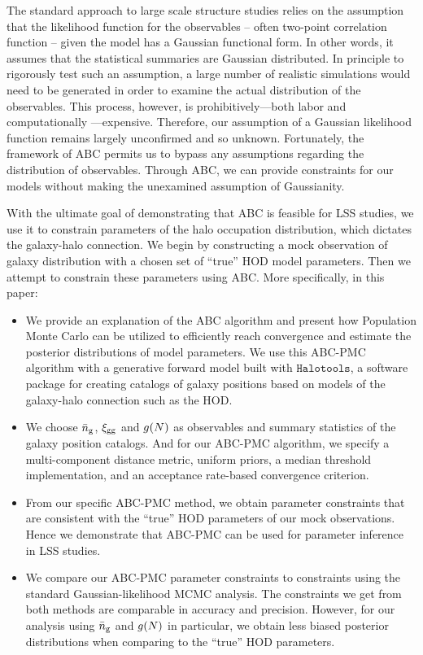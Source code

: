 The standard approach to large scale structure studies relies on the assumption that the likelihood function 
for the observables -- often two-point correlation function -- given the model has a Gaussian functional form. 
In other words, it assumes that the statistical summaries are Gaussian distributed. In principle to rigorously 
test such an assumption, a large number of realistic simulations would need to be generated in order to examine 
the actual distribution of the observables. This process, however, is prohibitively---both labor and computationally 
---expensive. Therefore, our assumption of a Gaussian likelihood function remains largely unconfirmed and so 
unknown. Fortunately, the framework of ABC permits us to bypass any 
assumptions regarding the distribution of observables. Through ABC, we can provide constraints for our models without making the unexamined assumption of Gaussianity. 

With the ultimate goal of demonstrating that ABC is feasible for LSS studies, we use it to 
constrain parameters of the halo occupation distribution, which dictates the galaxy-halo connection. 
We begin by constructing a mock observation of galaxy distribution with a chosen set of ``true'' HOD model 
parameters. Then we attempt to constrain these parameters using ABC. More specifically, in this paper: 

\begin{itemize}
\item We provide an explanation of the ABC algorithm and present how Population Monte Carlo can be utilized 
to efficiently reach convergence and estimate the posterior distributions of model parameters. 
We use this ABC-PMC algorithm with a generative forward model built with $\mathtt{Halotools}$, a software 
package for creating catalogs of galaxy positions based on models of the galaxy-halo connection such as the HOD. 

\item We choose $\bar{n}_{\mathrm{g}}$, $\xi_{\mathrm{gg}}$ and $g(N)$ as observables and summary statistics of the galaxy position catalogs. 
And for our ABC-PMC algorithm, we specify a multi-component distance metric, uniform priors, 
a median threshold implementation, and an acceptance rate-based convergence criterion.

\item From our specific ABC-PMC method, we obtain parameter constraints that are consistent with the ``true'' HOD parameters of our mock observations. Hence we demonstrate that ABC-PMC can be used for parameter inference in LSS studies. 

\item We compare our ABC-PMC parameter constraints to constraints using the standard Gaussian-likelihood
MCMC analysis. The constraints we get from both methods are comparable in accuracy and precision. However, 
for our analysis using $\bar{n}_{\mathrm{g}}$ and $g(N)$ in particular, we obtain less biased posterior distributions when
comparing to the ``true'' HOD parameters. 
\end{itemize}


